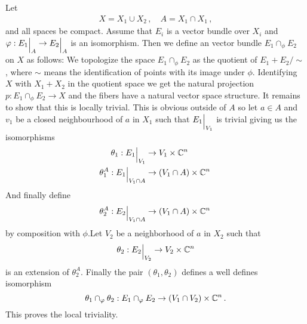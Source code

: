 \begin{definition} \label{def: Glueing and Clutching of Vector Bundles}
	Let 
	\begin{align*}
		X=X_1 \cup X_2\, , \quad A=X_1 \cap X_1 \, ,
	\end{align*}
	and all spaces be compact. Assume that $E_i$ is a vector bundle over $X_i$ and $\phi :{E_1}\einsch{A} \to {E_2}\einsch{A}$ is an isomorphism. Then we define an vector bundle $E_1 \cap_{\phi} E_2$ on $X$ as follows:
	We topologize the space $E_1 \cap_{\phi} E_2$ as the quotient of $E_1 + E_2 \slash \sim$, where $\sim$ means the identification of points with its image under $\phi$. Identifying $X$ with $X_1 +X_2 $ in the quotient space we get the natural projection $p:E_1 \cap_{\phi} E_2 \to X$ and the fibers have a natural vector space structure. It remains to show that this is locally trivial. This is obvious outside of $A$ so let $a\in A$ and $v_1$ be a closed neighbourhood of $a$ in $X_1$ such that ${E_1}\einsch{V_1}$ is trivial giving us the isomorphisms
	\begin{align*}
		\theta_1: {E_1}\einsch{V_1} &\to V_1 \times \C^n \, \\
		\theta_1^A: {E_1}\einsch{V_1\cap A} &\to (V_1\cap A) \times \C^n \,
	\end{align*}
	And finally define
	\begin{equation*}
		\theta^A_2: {E_2}\einsch{V_1\cap A}\to (V_1\cap A) \times \C^n \,
	\end{equation*} by composition with $\phi$.Let $V_2$ be a neighborhood of $a$ in $X_2$ such that 
	\begin{align*}
		\theta_2:{E_2}\einsch{V_2}\to V_2 \times \C^n
	\end{align*} is an extension of $\theta_2^A$. Finally the pair $(\theta_1,\theta_2)$ defines a well defines isomorphism 
	\begin{equation*}
		\theta_1 \cap_{\varphi} \theta _2: E_1 \cap_{\varphi} E_2 \to (V_1 \cap V_2)\times \mathbb{C}^n\, .
	\end{equation*} This proves the local triviality.
\end{definition}

